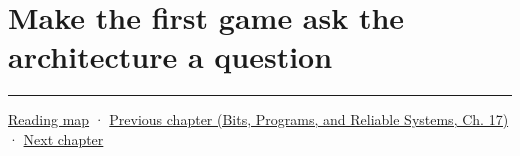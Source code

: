 \section{Make the first game ask the architecture a question}\label{05-engine-i-ch008-make-the-first-game-ask-the-architecture-a-question}

\begin{center}\rule{0.5\linewidth}{0.5pt}\end{center}

\hyperref[volume-reading-map]{Reading map} · \href{../01-Bits-Programs-and-Reliable-Systems/main.pdf\#nameddest=05-engine-i-ch007-typed-apis-and-measured-cpu-data-structures}{Previous chapter (Bits, Programs, and Reliable Systems, Ch. 17)} · \hyperref[05-engine-i-ch009-player-choices-rules-and-readable-feedback]{Next chapter}
